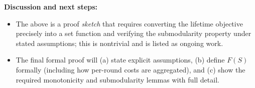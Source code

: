 \textbf{Discussion and next steps:}
\begin{itemize}
  \item The above is a proof \emph{sketch} that requires converting the lifetime objective precisely into a set function and verifying the submodularity property under stated assumptions; this is nontrivial and is listed as ongoing work.
  \item The final formal proof will (a) state explicit assumptions, (b) define $F(S)$ formally (including how per-round costs are aggregated), and (c) show the required monotonicity and submodularity lemmas with full detail.
\end{itemize}
